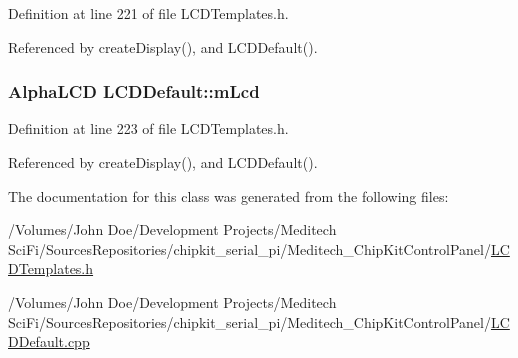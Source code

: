 Definition at line 221 of file L\-C\-D\-Templates.\-h.



Referenced by create\-Display(), and L\-C\-D\-Default().

\hypertarget{class_l_c_d_default_a9062ca1e44b8e0e5d360b00ce9218078}{
\subsubsection[{m\-Lcd}]{\setlength{\rightskip}{0pt plus 5cm}Alpha\-L\-C\-D L\-C\-D\-Default\-::m\-Lcd\hspace{0.3cm}{\ttfamily [private]}}}\label{class_l_c_d_default_a9062ca1e44b8e0e5d360b00ce9218078}


Definition at line 223 of file L\-C\-D\-Templates.\-h.



Referenced by create\-Display(), and L\-C\-D\-Default().



The documentation for this class was generated from the following files\-:\begin{DoxyCompactItemize}
\item 
/\-Volumes/\-John Doe/\-Development Projects/\-Meditech Sci\-Fi/\-Sources\-Repositories/chipkit\-\_\-serial\-\_\-pi/\-Meditech\-\_\-\-Chip\-Kit\-Control\-Panel/\hyperlink{_l_c_d_templates_8h}{L\-C\-D\-Templates.\-h}\item 
/\-Volumes/\-John Doe/\-Development Projects/\-Meditech Sci\-Fi/\-Sources\-Repositories/chipkit\-\_\-serial\-\_\-pi/\-Meditech\-\_\-\-Chip\-Kit\-Control\-Panel/\hyperlink{_l_c_d_default_8cpp}{L\-C\-D\-Default.\-cpp}\end{DoxyCompactItemize}
